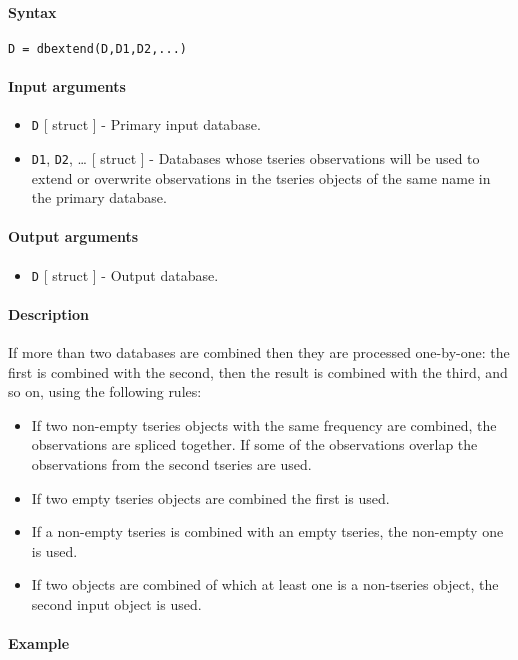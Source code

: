 


	\paragraph{Syntax}\label{syntax}

\begin{verbatim}
D = dbextend(D,D1,D2,...)
\end{verbatim}

\paragraph{Input arguments}\label{input-arguments}

\begin{itemize}
\item
  \texttt{D} {[} struct {]} - Primary input database.
\item
  \texttt{D1}, \texttt{D2}, \ldots{} {[} struct {]} - Databases whose
  tseries observations will be used to extend or overwrite observations
  in the tseries objects of the same name in the primary database.
\end{itemize}

\paragraph{Output arguments}\label{output-arguments}

\begin{itemize}
\itemsep1pt\parskip0pt
\item
  \texttt{D} {[} struct {]} - Output database.
\end{itemize}

\paragraph{Description}\label{description}

If more than two databases are combined then they are processed
one-by-one: the first is combined with the second, then the result is
combined with the third, and so on, using the following rules:

\begin{itemize}
\itemsep1pt\parskip0pt
\item
  If two non-empty tseries objects with the same frequency are combined,
  the observations are spliced together. If some of the observations
  overlap the observations from the second tseries are used.
\item
  If two empty tseries objects are combined the first is used.
\item
  If a non-empty tseries is combined with an empty tseries, the
  non-empty one is used.
\item
  If two objects are combined of which at least one is a non-tseries
  object, the second input object is used.
\end{itemize}

\paragraph{Example}\label{example}


